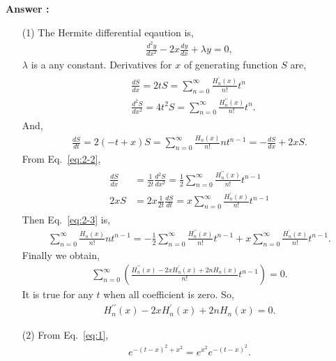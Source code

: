 \documentclass[floatfix,nofootinbib,superscriptaddress,fleqn]{revtex4-2}
\begin{document}
\noindent \textbf{Answer : }
\begin{itemize}
\item[(1)] The Hermite differential eqaution is,
\begin{align}\label{eq:2-1}
  \frac{d^2y}{dx^2}-2x\frac{dy}{dx}+\lambda y = 0,
\end{align}
$\lambda$ is a any constant. Derivatives for $x$ of generating function $S$ are,
\begin{align}\label{eq:2-2}
  \begin{split}
    &\frac{dS}{dx} = 2tS = \sum^\infty_{n=0}
    \frac{H^\prime_n(x)}{n!}t^n  \\
    &\frac{d^2S}{dx^2} = 4t^2S=\sum^\infty_{n=0}
    \frac{H^{\prime\prime}_n(x)}{n!}t^n.
  \end{split}
\end{align}
And,
\begin{align}\label{eq:2-3}
  \frac{dS}{dt} = 2(-t+x)S = \sum^\infty_{n=0}
  \frac{H_n(x)}{n!}nt^{n-1}
  =-\frac{dS}{dx} +2xS.
\end{align}
From Eq.~\eqref{eq:2-2},
\begin{align*}
  \begin{split}
    \frac{dS}{dx} &= \frac{1}{2t}\frac{d^2S}{dx^2}
    =\frac{1}{2}\sum^\infty_{n=0}
    \frac{H^{\prime\prime}_n(x)}{n!}t^{n-1}  \\
    2xS &= 2x\frac{1}{2t}\frac{dS}{dt} 
    =x\sum^\infty_{n=0}\frac{H^{\prime}_n(x)}{n!}t^{n-1}
  \end{split}
\end{align*}
Then Eq.~\eqref{eq:2-3} is,
\begin{align*}
  \sum^\infty_{n=0}\frac{H_n(x)}{n!}nt^{n-1}
  =-\frac{1}{2}\sum^\infty_{n=0}\frac{H^{\prime\prime}_n(x)}{n!}t^{n-1}
  +x\sum^\infty_{n=0}\frac{H^{\prime}_n(x)}{n!}t^{n-1}.
\end{align*}
Finally we obtain,
\begin{align*}
  \sum^\infty_{n=0}\left(\frac{H^{\prime\prime}_n(x)
  -2xH^{\prime}_n(x)+2nH_n(x)}{n!}t^{n-1}\right)=0.
\end{align*}
It is true for any $t$ when all coefficient is zero. So,
\begin{align}\label{eq:2-4}
  H^{\prime\prime}_n(x)
  -2xH^{\prime}_n(x)+2nH_n(x)=0.
\end{align}
\item[(2)] From Eq.~\eqref{eq:1}, 
\begin{align*}
  e^{-(t-x)^2+x^2}=e^{x^2}e^{-(t-x)^2}.
\end{align*}

\end{itemize}
\end{document}
